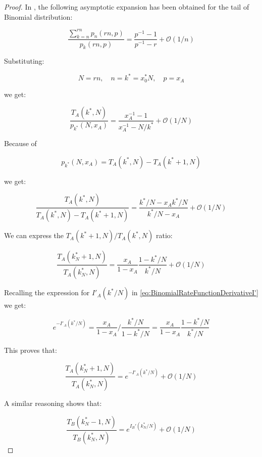 \documentclass{article}
\theoremstyle{definition}
\begin{document}
\begin{proof}
    In \cite{paper:AsymptoticExpansionBinomialTail}, the following asymptotic expansion has been obtained for the tail of Binomial distribution:

    \begin{equation}
        \frac{\sum_{k=n}^{r n} p_n(r n,p)}{p_k(r n,p)} = \frac{p^{-1}-1}{p^{-1}-r} + \mathcal{O}(1/n)
    \end{equation}

    Substituting:

    \begin{equation}
        N = r n, \quad n=k^*=x^*_0 N, \quad p = x_A
    \end{equation}

    we get:

    \begin{equation}
        \frac{T_A(k^*,N)}{p_{k^*}(N,x_A)} =
        \frac{x_A^{-1} - 1}{x_A^{-1} - N/{k^*}} +
        \mathcal{O}(1/N)
    \end{equation}

    Because of

    \begin{equation}
        p_{k^*}(N,x_A) = 
        T_A(k^*,N) - T_A(k^*+1,N)
    \end{equation}

    we get:

    \begin{equation}
        \frac{T_A(k^*,N)}{T_A(k^*,N) - T_A(k^*+1,N)} =
        \frac{k^*/N - x_A k^*/N}{k^*/N - x_A} +
        \mathcal{O}(1/N)
    \end{equation}

    We can express the $T_A(k^*+1,N)/T_A(k^*,N)$ ratio:

    \begin{equation}
        \frac{T_A(k^*_N+1,N)}{T_A(k^*_N,N)} = 
        \frac{x_A}{1-x_A} \frac{1-k^*/N}{k^*/N}
        + \mathcal{O}(1/N)
    \end{equation}

    Recalling the expression for $I'_A(k^*/N)$ in \eqref{eq:BinomialRateFunctionDerivativeI'} we get:

    \begin{equation}
        e^{-I'_A(k^*/N)} =
        \frac{x_A}{1-x_A} \Big / \frac{k^*/N}{1-k^*/N} = 
        \frac{x_A}{1-x_A} \frac{1-k^*/N}{k^*/N}
    \end{equation}

    This proves that:

    \begin{equation}
        \frac{T_A(k^*_N+1,N)}{T_A(k^*_N,N)} = 
        e^{-I'_A(k^*/N)}
        + \mathcal{O}(1/N)
    \end{equation}

    A similar reasoning shows that:

\begin{equation}
    \frac{T_B(k^*_N-1,N)}{T_B(k^*_N,N)} = 
    e^{I_B'(k^*_N/N)}
    + \mathcal{O}(1/N)
\end{equation}
    
\end{proof}
\end{document}
